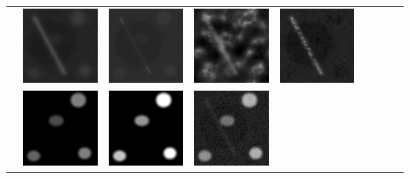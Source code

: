 \begin{tabular}{M{0.02cm}*{8}{M{2.5cm}}}
        &\includegraphics[width=\figurelength]{img/chapitre3/figure7/maps/img_6_3.png}
        &\includegraphics[width=\figurelength]{img/chapitre3/figure7/maps/img_7_3.png}
        &\includegraphics[width=\figurelength]{img/chapitre3/figure7/maps/img_8_3.png}
        &\includegraphics[width=\figurelength]{img/chapitre3/figure7/maps/img_9_3.png}\\
        &\includegraphics[width=\figurelength]{img/chapitre3/figure7/maps/img_1_4.png}
        &\includegraphics[width=\figurelength]{img/chapitre3/figure7/maps/img_2_4.png}
        &\includegraphics[width=\figurelength]{img/chapitre3/figure7/maps/img_3_4.png}

\end{tabular}
